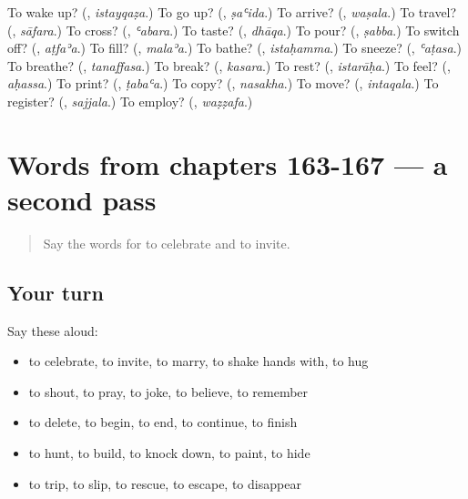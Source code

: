 \begin{tcolorbox}[breakable,colback=teal!4,colframe=teal!35!black,title={Before you move on}]
To wake up? (\textbf{}, \emph{istayqaẓa}.) To go up? (\textbf{}, \emph{ṣaʿida}.) To arrive? (\textbf{}, \emph{waṣala}.) To travel? (\textbf{}, \emph{sāfara}.) To cross? (\textbf{}, \emph{ʿabara}.) To taste? (\textbf{}, \emph{dhāqa}.) To pour? (\textbf{}, \emph{ṣabba}.) To switch off? (\textbf{}, \emph{aṭfaʾa}.) To fill? (\textbf{}, \emph{malaʾa}.) To bathe? (\textbf{}, \emph{istaḥamma}.) To sneeze? (\textbf{}, \emph{ʿaṭasa}.) To breathe? (\textbf{}, \emph{tanaffasa}.) To break? (\textbf{}, \emph{kasara}.) To rest? (\textbf{}, \emph{istarāḥa}.) To feel? (\textbf{}, \emph{aḥassa}.) To print? (\textbf{}, \emph{ṭabaʿa}.) To copy? (\textbf{}, \emph{nasakha}.) To move? (\textbf{}, \emph{intaqala}.) To register? (\textbf{}, \emph{sajjala}.) To employ? (\textbf{}, \emph{waẓẓafa}.)
\end{tcolorbox}
\section[(dialogue)]{Words from chapters 163-167 — a second pass}

\label{lesson:AR-R167-second-pass-words-from-chapters-163-167}



\begin{quote}
Say the words for to celebrate and to invite.
\end{quote}

\subsection*{Your turn}
Say these aloud:

\begin{itemize}
\raggedright
  \item to celebrate, to invite, to marry, to shake hands with, to hug
  \item to shout, to pray, to joke, to believe, to remember
  \item to delete, to begin, to end, to continue, to finish
  \item to hunt, to build, to knock down, to paint, to hide
  \item to trip, to slip, to rescue, to escape, to disappear
\end{itemize}

